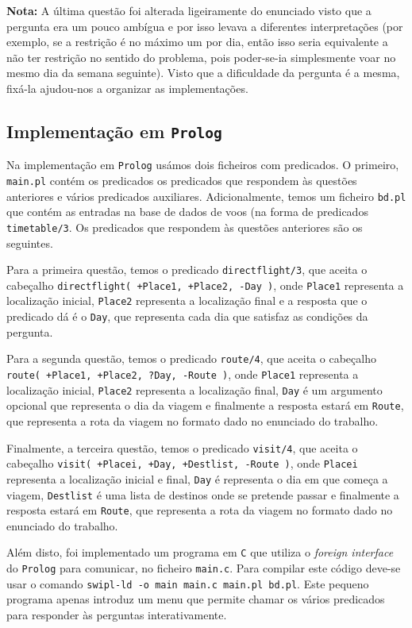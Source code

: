 \documentclass[12pt,a4paper,oneside]{article}
\begin{document}
\textbf{Nota:} A última questão foi alterada ligeiramente do enunciado
visto que a pergunta era um pouco ambígua e por isso levava a
diferentes interpretações (por exemplo, se a restrição é no máximo um
por dia, então isso seria equivalente a não ter restrição no sentido
do problema, pois poder-se-ia simplesmente voar no mesmo dia da semana
seguinte). Visto que a dificuldade da pergunta é a mesma, fixá-la
ajudou-nos a organizar as implementações.

\subsection{Implementação em \texttt{Prolog}}

Na implementação em \texttt{Prolog} usámos dois ficheiros com
predicados. O primeiro, \texttt{main.pl} contém os predicados os
predicados que respondem às questões anteriores e vários predicados
auxiliares. Adicionalmente, temos um ficheiro \texttt{bd.pl} que
contém as entradas na base de dados de voos (na forma de predicados
\texttt{timetable/3}. Os predicados que respondem às questões
anteriores são os seguintes.

Para a primeira questão, temos o predicado \texttt{directflight/3}, que
aceita o cabeçalho \texttt{directflight( +Place1, +Place2, -Day )}, onde
\texttt{Place1} representa a localização inicial, \texttt{Place2}
representa a localização final e a resposta que o predicado dá é o
\texttt{Day}, que representa cada dia que satisfaz as condições da
pergunta.

Para a segunda questão, temos o predicado \texttt{route/4}, que aceita
o cabeçalho \texttt{route( +Place1, +Place2, ?Day, -Route )}, onde
\texttt{Place1} representa a localização inicial, \texttt{Place2}
representa a localização final, \texttt{Day} é um argumento opcional
que representa o dia da viagem e finalmente a resposta estará em
\texttt{Route}, que representa a rota da viagem no formato dado no
enunciado do trabalho.

Finalmente, a terceira questão, temos o predicado \texttt{visit/4},
que aceita o cabeçalho \texttt{visit( +Placei, +Day, +Destlist,
  -Route )}, onde \texttt{Placei} representa a localização inicial e
final, \texttt{Day} é representa o dia em que começa a viagem,
\texttt{Destlist} é uma lista de destinos onde se pretende passar e
finalmente a resposta estará em \texttt{Route}, que representa a rota
da viagem no formato dado no enunciado do trabalho.

Além disto, foi implementado um programa em \texttt{C} que utiliza o
\textit{foreign interface} do \texttt{Prolog} para comunicar, no
ficheiro \texttt{main.c}. Para compilar este código deve-se usar o
comando \texttt{swipl-ld -o main main.c main.pl bd.pl}. Este pequeno
programa apenas introduz um menu que permite chamar os vários
predicados para responder às perguntas interativamente.
\end{document}
